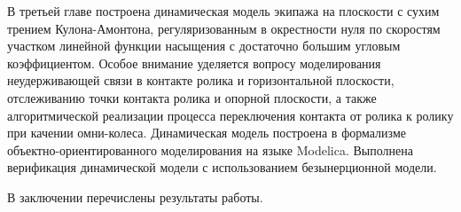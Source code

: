 В третьей главе построена динамическая модель экипажа на плоскости с сухим трением Кулона-Амонтона, регуляризованным в окрестности нуля по скоростям участком линейной функции насыщения с достаточно большим угловым коэффициентом. Особое внимание уделяется вопросу моделирования неудерживающей связи в контакте ролика и горизонтальной плоскости, отслеживанию точки контакта ролика и опорной плоскости, а также алгоритмической реализации процесса переключения контакта от ролика к ролику при качении омни-колеса. Динамическая модель построена в формализме объектно-ориентированного моделирования на языке Modelica. Выполнена верификация динамической модели с использованием безынерционной модели.

В заключении перечислены результаты работы.





